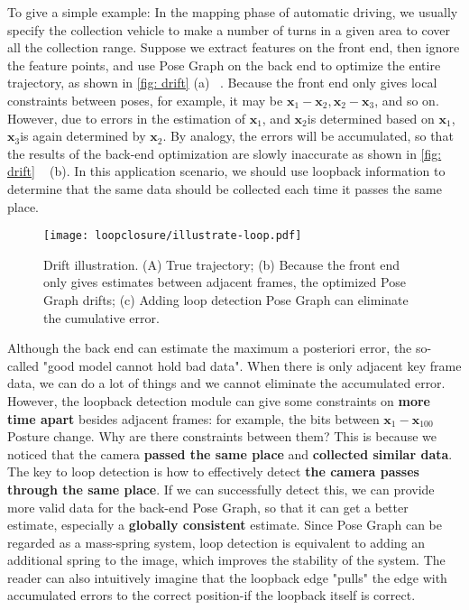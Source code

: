 To give a simple example: In the mapping phase of automatic driving, we usually specify the collection vehicle to make a number of turns in a given area to cover all the collection range. Suppose we extract features on the front end, then ignore the feature points, and use Pose Graph on the back end to optimize the entire trajectory, as shown in \autoref{fig: drift} (a) ~. Because the front end only gives local constraints between poses, for example, it may be $\bm{x} _1-\bm{x} _2, \bm{x} _2- \bm{x} _3 $, and so on. However, due to errors in the estimation of $\bm{x} _1 $, and $\bm{x} _2 $is determined based on $\bm{x} _1 $, $\bm{x} _3 $is again determined by $\bm{x} _2 $. By analogy, the errors will be accumulated, so that the results of the back-end optimization are slowly inaccurate as shown in \autoref{fig: drift} ~ (b). In this application scenario, we should use loopback information to determine that the same data should be collected each time it passes the same place.

\begin{figure}[! htp]
\centering
\texttt{[image: loopclosure/illustrate-loop.pdf]}
\caption{Drift illustration. (A) True trajectory; (b) Because the front end only gives estimates between adjacent frames, the optimized Pose Graph drifts; (c) Adding loop detection Pose Graph can eliminate the cumulative error. }
\label{fig: drift}
\end{figure}

Although the back end can estimate the maximum a posteriori error, the so-called "good model cannot hold bad data". When there is only adjacent key frame data, we can do a lot of things and we cannot eliminate the accumulated error. However, the loopback detection module can give some constraints on \textbf{more time apart} besides adjacent frames: for example, the bits between $\bm{x} _1- \bm{x} _{100} $Posture change. Why are there constraints between them? This is because we noticed that the camera \textbf{passed the same place} and \textbf{collected similar data}. The key to loop detection is how to effectively detect \textbf{the camera passes through the same place}. If we can successfully detect this, we can provide more valid data for the back-end Pose Graph, so that it can get a better estimate, especially a \textbf{globally consistent} estimate. Since Pose Graph can be regarded as a mass-spring system, loop detection is equivalent to adding an additional spring to the image, which improves the stability of the system. The reader can also intuitively imagine that the loopback edge "pulls" the edge with accumulated errors to the correct position-if the loopback itself is correct.

